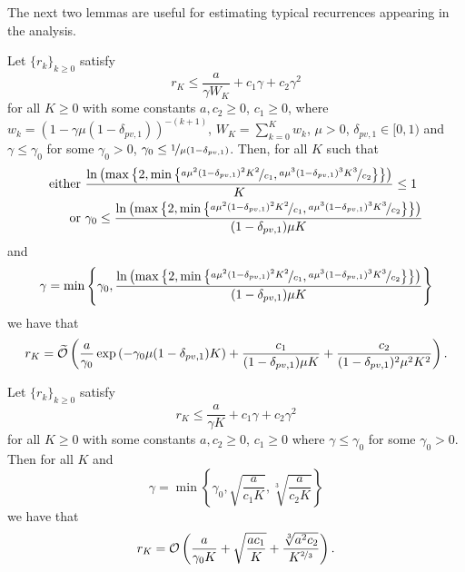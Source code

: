 The next two lemmas are useful for estimating typical recurrences appearing in the analysis.
\begin{lemma}\label{lem:lemma_i_2_gorbunov}
    Let $\{r_k\}_{k\ge 0}$ satisfy
    \begin{equation*}
        r_K \le \frac{a}{\gamma W_K} + c_1\gamma + c_2\gamma^2
    \end{equation*}
    for all $K \ge 0$ with some constants $a,c_2 \ge 0$, $c_1 \ge 0$, where $w_k = (1-\gamma\mu(1-\delta_{pv,1}))^{-(k+1)}$, $W_K = \sum_{k=0}^Kw_k$, $\mu > 0$, $\delta_{pv,1}\in [0,1)$ and $\gamma \le \gamma_0$ for some $\gamma_0 > 0$, $\gamma_0 \le \nicefrac{1}{\mu(1-\delta_{pv,1})}$. Then, for all $K$ such that
    \begin{align*}
        \text{either  } & \frac{\ln\left(\max\left\{2, \min\left\{\nicefrac{a\mu^2(1-\delta_{pv,1})^2K^2}{c_1},\nicefrac{a\mu^3(1-\delta_{pv,1})^3K^3}{c_2}\right\}\right\}\right)}{K} \le 1\\
        \text{or  } & \gamma_0 \le \frac{\ln\left(\max\left\{2, \min\left\{\nicefrac{a\mu^2(1-\delta_{pv,1})^2K^2}{c_1},\nicefrac{a\mu^3(1-\delta_{pv,1})^3K^3}{c_2}\right\}\right\}\right)}{(1-\delta_{pv,1})\mu K}
    \end{align*}
    and
    \begin{equation*}
        \gamma = \min\left\{\gamma_0, \frac{\ln\left(\max\left\{2, \min\left\{\nicefrac{a\mu^2(1-\delta_{pv,1})^2K^2}{c_1},\nicefrac{a\mu^3(1-\delta_{pv,1})^3K^3}{c_2}\right\}\right\}\right)}{(1-\delta_{pv,1})\mu K}\right\}
    \end{equation*}
    we have that
    \begin{equation*}
        r_K = \widetilde{{\cal O}}\left(\frac{a}{\gamma_0}\exp\left(-\gamma_0\mu(1-\delta_{pv,1})K\right) + \frac{c_1}{(1-\delta_{pv,1})\mu K} + \frac{c_2}{(1-\delta_{pv,1})^2\mu^2 K^2}\right).
    \end{equation*}
\end{lemma}

\begin{lemma}\label{lem:lemma_i_3_gorbunov}
    Let $\{r_k\}_{k\ge 0}$ satisfy
    \begin{equation*}
        r_K \le \frac{a}{\gamma K} + c_1\gamma + c_2\gamma^2
    \end{equation*}
    for all $K \ge 0$ with some constants $a,c_2 \ge 0$, $c_1 \ge 0$ where $\gamma \le \gamma_0$ for some $\gamma_0 > 0$. Then for all $K$ and
    \begin{equation*}
        \gamma = \min\left\{\gamma_0, \sqrt{\frac{a}{c_1 K}}, \sqrt[3]{\frac{a}{c_2 K}}\right\}
    \end{equation*}
    we have that
    \begin{equation*}
        r_K = {\cal O}\left(\frac{a}{\gamma_0 K} + \sqrt{\frac{ac_1}{K}} + \frac{\sqrt[3]{a^2c_2}}{K^{\nicefrac{2}{3}}}\right).
    \end{equation*}
\end{lemma}

